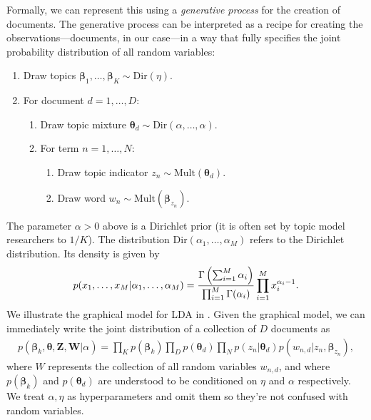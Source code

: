 Formally, we can represent this using a \emph{generative process} for
the creation of documents.  The generative process can be interpreted as
a recipe for creating the observations---documents, in our case---in a
way that fully specifies the joint probability distribution of all
random variables:
\begin{enumerate}
  \item Draw topics $\bm \beta_1, \ldots, \bm \beta_K \sim \mbox{Dir}(\eta)$.
    \item For document $d=1, \ldots, D$:
    \begin{enumerate}
    \item Draw topic mixture $\bm \theta_d \sim \mbox{Dir}(\alpha, \ldots, \alpha)$.
    \item For term $n=1, \ldots, N$:
      \begin{enumerate}
      \item Draw topic indicator $z_n \sim \mbox{Mult}(\bm \theta_d)$.
      \item Draw word $w_n \sim \mbox{Mult}(\bm \beta_{z_n})$.
      \end{enumerate}
    \end{enumerate}
\end{enumerate}
The parameter $\alpha > 0$ above is a Dirichlet prior (it is often set by
topic model researchers to $1/K$).  The distribution $\mbox{Dir}(\alpha_1, \ldots, \alpha_M)$ refers to the Dirichlet distribution.  Its density is given by
\begin{align}
  p(x_1, \ldots, x_M | \alpha_1, \ldots, \alpha_M) =
  \frac{\large \Gamma \left( \sum_{i=1}^M \alpha_i \right)}
       {\prod_{i=1}^M \large \Gamma(\alpha_i)}
       \prod_{i=1}^M x_i^{\alpha_i - 1}.
\end{align}
We illustrate the graphical model for LDA in .  Given the graphical model, we can immediately write the joint distribution of a collection of $D$ documents as
\begin{align}
  p(\bm \beta_k, \bm \theta, \bm Z, \bm W | \alpha) = 
  \prod_K p(\bm \beta_k)
  \prod_D p(\bm \theta_d) \prod_N p(z_n | \bm \theta_d) p(w_{n,d} | z_n, \bm \beta_{z_n}),
\end{align}
where $W$ represents the collection of all random variables $w_{n,d}$,
and where $p(\bm \beta_k)$ and $p(\bm \theta_d)$ are understood to be conditioned
on $\eta$ and $\alpha$ respectively.  We treat $\alpha, \eta$ as
hyperparameters and omit them so they're not confused with random
variables.

